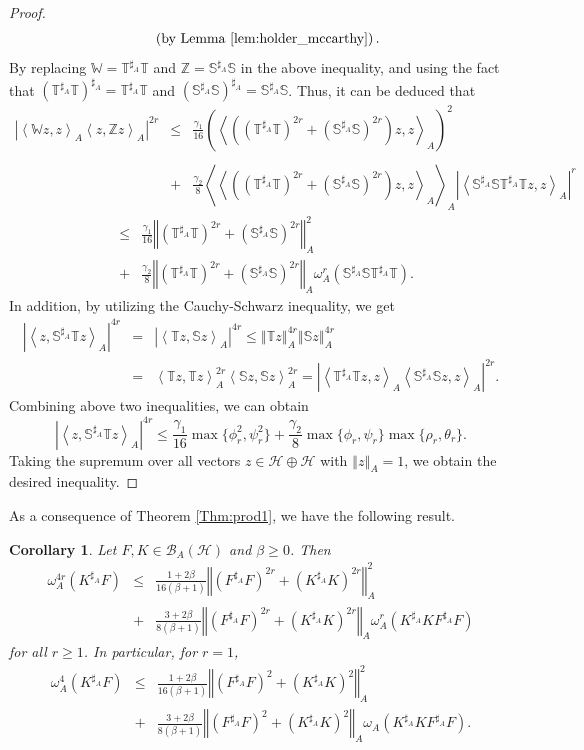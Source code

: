 \documentclass{article}
\newcommand{\bra}[1]{\left(#1\right)}
\newcommand{\seqA}[1]{{\left<#1\right>}_{A}}
\newcommand{\normA}[1]{{\left\Vert#1\right\Vert}_{A}}
\newcommand{\abs}[1]{\left\vert#1\right\vert}
\newcommand{\hh}{\mathcal{H}\oplus\mathcal{H}}
\newcommand {\W}{\mathbb{W}}
\newcommand {\Z}{\mathbb{Z}}
\newcommand {\T}{\mathbb{T}}
\newcommand {\h}{\mathcal{H}}
\renewcommand {\S}{\mathbb{S}}
\newcommand {\Ta}{\mathbb{T}^{\sharp_{A}}}
\newcommand {\Sa}{\mathbb{S}^{\sharp_{A}}}
\renewcommand {\b}{\mathcal{B}}
\newtheorem{corollary}[theorem]{Corollary}
\begin{document}
\begin{proof}
\begin{eqnarray*}
    &&\bra{\mbox{by Lemma \ref{lem:holder_mccarthy}}}.
 \end{eqnarray*}
 By replacing $\W=\Ta \T$ and $\Z=\Sa \S$ in the above inequality, and using the fact that $\bra{\Ta \T}^{\sharp_A}=\Ta\T$ and
 $\bra{\Sa\S}^{\sharp_A}=\Sa\S$. Thus, it can be deduced that
  \begin{eqnarray*}
    \abs{\seqA{\W z,z}\seqA{z,\Z z}}^{2r}&\leq&  \frac{\gamma_1}{16}\bra{\seqA{\bra{\bra{\Ta\T}^{2r}+\bra{\Sa\S}^{2r}} z,z}}^2\\
     \\
    &+&\frac{\gamma_2}{8}\seqA{\seqA{\bra{\bra{\Ta\T}^{2r}+\bra{\Sa\S}^{2r}} z,z}}\abs{\seqA{\Sa\S\Ta\T z, z}}^{r}
    \end{eqnarray*}
    \begin{eqnarray*}
    &\leq&\frac{\gamma_1}{16}\normA{\bra{\Ta\T}^{2r}+\bra{\Sa\S}^{2r}}^2\\
    &+& \frac{\gamma_2}{8}\normA{\bra{\Ta\T}^{2r}+\bra{\Sa\S}^{2r}}
    \omega_A^{r}\bra{\Sa\S\Ta\T}.
  \end{eqnarray*}
  In addition, by utilizing the Cauchy-Schwarz inequality, we get
  \begin{eqnarray*}
    \abs{\seqA{z,\Sa\T z}}^{4r} &=&\abs{\seqA{\T z,\S z}}^{4r} \leq  \normA{\T z}^{4r}\normA{\S z}^{4r}\\
     &=& \seqA{\T z,\T z}^{2r}\seqA{\S z,\S z}^{2r}=\abs{\seqA{\Ta\T z,z}\seqA{\Sa\S z,z}}^{2r}.
  \end{eqnarray*}
  Combining above two inequalities, we can obtain
  $$\abs{\seqA{z,\Sa\T z}}^{4r} \leq \frac{\gamma_1}{16}\max\{\phi_r^2,\psi_r^2\}+\frac{\gamma_2}{8}\max\{\phi_r,\psi_r\}
  \max\{\rho_r,\theta_r\}.$$
  Taking the supremum over all vectors $z\in\hh$ with $\normA{z}=1$, we obtain the desired inequality.
  \end{proof}
 As a consequence of Theorem \ref{Thm:prod1}, we have the following result.
 \begin{corollary}\label{Cor:prod} Let $F,K\in\b_A(\h)$ and $\beta\geq 0$. Then
 \begin{eqnarray}\label{Eq:prod2}
   \omega_A^{4r}\bra{K^{\sharp_A}F} &\leq& \frac{1+2\beta}{16(\beta+1)}\normA{\bra{F^{\sharp_A}F}^{2r}+\bra{K^{\sharp_A}K}^{2r}}^2\\
    &+& \frac{3+2\beta}{8(\beta+1)}\normA{\bra{F^{\sharp_A}F}^{2r}+\bra{K^{\sharp_A}K}^{2r}}\omega_A^{r}\bra{K^{\sharp_A}KF^{\sharp_A}F}\nonumber
 \end{eqnarray}
 for all $r\geq 1$. In particular, for $r=1$,
 \begin{eqnarray}\label{Eq:prod3}
   \omega_A^{4}\bra{K^{\sharp_A}F} &\leq& \frac{1+2\beta}{16(\beta+1)}\normA{\bra{F^{\sharp_A}F}^{2}+\bra{K^{\sharp_A}K}^{2}}^2\\
    &+& \frac{3+2\beta}{8(\beta+1)}\normA{\bra{F^{\sharp_A}F}^{2}+\bra{K^{\sharp_A}K}^{2}}\omega_A\bra{K^{\sharp_A}KF^{\sharp_A}F}.\nonumber
 \end{eqnarray}
 \end{corollary}
\end{document}

